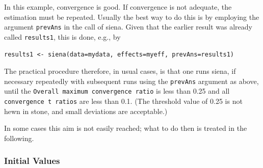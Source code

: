 \documentclass[a4paper,fleqn,11pt]{article}
\newcommand{\+}{\, + \,}
\newcommand{\sfn}[1]{\textsf{#1}}
\begin{document}
In this example, convergence is good.
If convergence is not adequate, the estimation must be repeated.
Usually the best way to do this is by employing the
argument \texttt{prevAns} in the call of \sfn{siena}.
Given that the earlier result was already called \texttt{results1},
this is done, e.g., by
\begin{verbatim}
results1 <- siena(data=mydata, effects=myeff, prevAns=results1)
\end{verbatim}
The practical procedure therefore, in usual cases, is that
one runs \sfn{siena}, if necessary repeatedly with
subsequent runs using the \texttt{prevAns} argument as above,
until the \texttt{Overall maximum convergence ratio} is less than 0.25
and all  \texttt{\small convergence t ratios}
are less than 0.1.
(The threshold value of 0.25 is not hewn in stone,
and small deviations are acceptable.)

In some cases this aim is not easily reached;
what to do then is treated in the following.

\subsubsection{Initial Values}
\label{S_initials}
\end{document}
